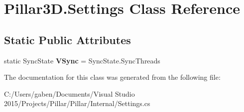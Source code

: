 \hypertarget{class_pillar3_d_1_1_settings}{}\section{Pillar3\+D.\+Settings Class Reference}
\label{class_pillar3_d_1_1_settings}
\subsection*{Static Public Attributes}
\begin{DoxyCompactItemize}
\item 
\mbox{\label{class_pillar3_d_1_1_settings_a7a6cee261459620721ab11476e6a154b}} 
static Sync\+State {\bfseries V\+Sync} = Sync\+State.\+Sync\+Threads
\end{DoxyCompactItemize}


The documentation for this class was generated from the following file\+:\begin{DoxyCompactItemize}
\item 
C\+:/\+Users/gaben/\+Documents/\+Visual Studio 2015/\+Projects/\+Pillar/\+Pillar/\+Internal/Settings.\+cs\end{DoxyCompactItemize}
